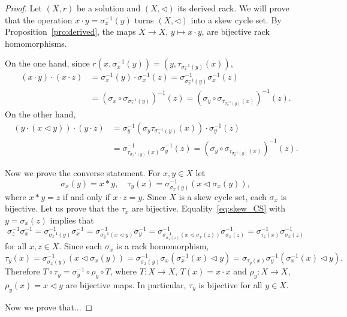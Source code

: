 \begin{proof}
Let $(X,r)$ be a solution and $(X,\triangleleft)$ its derived rack. We will prove that 
the operation $x\cdot y=\sigma_x^{-1}(y)$ turns $(X,\triangleleft)$ into a skew cycle set.
By Proposition~\ref{pro:derived}, 
the 
maps $X\to X$, $y\mapsto x\cdot y$, are bijective rack homomorphisms. 

On the one hand, since $r(x,\sigma_x^{-1}(y))=(y,\tau_{\sigma_x^{-1}(y)}(x))$, 
\begin{align*}
(x\cdot y)\cdot (x\cdot z)
&=\sigma_x^{-1}(y)\cdot\sigma_x^{-1}(z)
=\sigma_{\sigma_x^{-1}(y)}^{-1}\sigma_x^{-1}(z)\\
&=\left(\sigma_x\circ\sigma_{\sigma_x^{-1}(y)}\right)^{-1}(z)
=\left(\sigma_y\circ\sigma_{\tau_{\sigma_x^{-1}(y)}(x)}\right)^{-1}(z).
\end{align*}
On the other hand, 
\begin{align*}
(y\cdot (x\triangleleft y))\cdot (y\cdot z)
&=\sigma_y^{-1}(\sigma_y\tau_{\sigma_x^{-1}(y)}(x))\cdot\sigma_y^{-1}(z)\\
&=\sigma^{-1}_{\tau_{\sigma_x^{-1}(y)}(x)}\sigma_y^{-1}(z)
=\left(\sigma_y\circ\sigma_{\tau_{\sigma^{-1}_x(y)}(x)}\right)^{-1}(z).
\end{align*}

Now we prove the converse statement. 
For $x,y\in X$ let 
\[
\sigma_x(y)=x*y,
\quad
\tau_y(x)=\sigma_{\sigma_x(y)}^{-1}(x\triangleleft\sigma_x(y)), 
\]
where $x*y=z$ if and only if $x\cdot z=y$. 
Since $X$ is a skew cycle set, each $\sigma_x$ is bijective. Let us prove that the $\tau_x$ are bijective. 
Equality~\eqref{eq:skew_CS} with $y=\sigma_x(z)$ implies that
\[
\sigma_z^{-1}\sigma_x^{-1}=\sigma^{-1}_{\sigma_x^{-1}(y)}\sigma_x^{-1}
=\sigma^{-1}_{\sigma_y^{-1}(x\triangleleft y)}\sigma_y^{-1}
=\sigma^{-1}_{\sigma^{-1}_{\sigma_x(z)}(x\triangleleft\sigma_x(z))}\sigma^{-1}_{\sigma_x(z)}
=\sigma^{-1}_{\tau_z(x)}\sigma^{-1}_{\sigma_x(z)}
\]
for all $x,z\in X$. 
Since each $\sigma_x$ is a rack homomorphism, 
\[
\tau_y(x)=\sigma^{-1}_{\sigma_x(y)}(x\triangleleft\sigma_x(y))
=\sigma^{-1}_{\sigma_x(y)}\sigma_x(\sigma^{-1}_x(x)\triangleleft y)
=\sigma_{\tau_y(x)}\sigma_y^{-1}(\sigma_x^{-1}(x)\triangleleft y).
\]
Therefore $T\circ\tau_y=\sigma_y^{-1}\circ\rho_y\circ T$, where $T\colon X\to X$, $T(x)=x\cdot x$ 
and $\rho_y\colon X\to X$, $\rho_y(x)=x\triangleleft y$ are bijective maps. In particular, 
$\tau_y$ is bijective for all $y\in X$. 

Now we prove that...

\end{proof}

